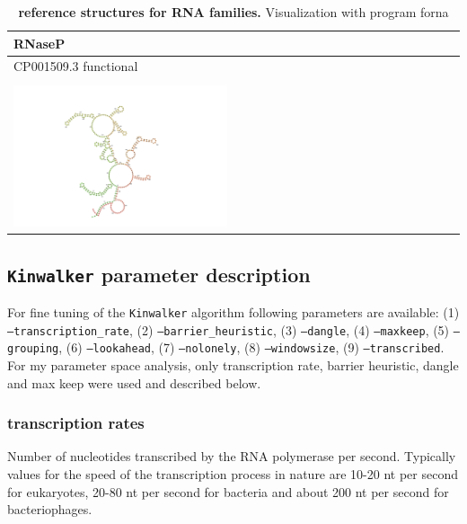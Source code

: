 \documentclass[ twoside,openright,titlepage,numbers=noenddot,headinclude,%
                footinclude=false, cleardoublepage=empty,abstractoff, %
                BCOR=5mm,paper=a4,fontsize=11pt,%
                ngerman,american,%
                ]{scrreprt}
\begin{document}
\begin{table}
\begin{tabular}{l|l}
\hline
  \multicolumn{2}{l}{{\bf RNaseP}}\\
  \hline
CP001509.3 functional & \\
\hline \\[5pt]
\includegraphics[width=0.5\textwidth]{./pictures/refStructure_pictures/CP001509-3-functional.png} \\
\end{tabular}
\caption{{\bf reference structures for RNA families.} Visualization with program forna \cite{forna} }
\label{table:reference structures}
\end{table}




\FloatBarrier

\subsection{\texttt{Kinwalker} parameter description} \label{kinwalker parameter description}

For fine tuning of the \texttt{Kinwalker} algorithm following parameters
are available: (1) \texttt{--transcription\_rate}, (2)
\texttt{--barrier\_heuristic}, (3) \texttt{--dangle}, (4)
\texttt{--maxkeep}, (5) \texttt{--grouping}, (6) \texttt{--lookahead}, (7)
\texttt{--nolonely}, (8) \texttt{--windowsize}, (9)
\texttt{--transcribed}. For my parameter space analysis, only transcription
rate, barrier heuristic, dangle and max keep were used and described below.
 



\subsubsection{transcription rates}

Number of nucleotides transcribed by the RNA polymerase per
second. Typically values for the speed of the transcription process in
nature are 10-20 nt per second for eukaryotes, 20-80 nt per second for
bacteria and about 200 nt per second for
bacteriophages\cite{transcriptionrates}.
\end{document}
